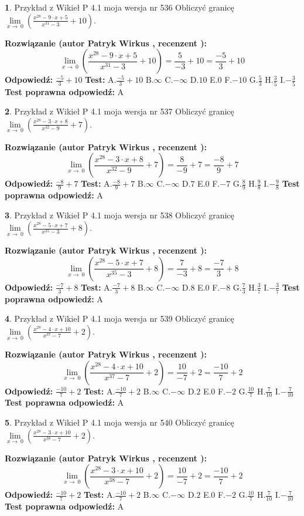 \documentclass[12pt, a4paper]{article}
\theoremstyle{definition} %
\newtheorem{zad}{}
\newcommand{\zadStart}[1]{\begin{zad}#1\newline}
\newcommand{\zadStop}{\end{zad}}
\newcommand{\rozwStart}[2]{\noindent \textbf{Rozwiązanie (autor #1 , recenzent #2): }\newline}
\newcommand{\rozwStop}{\newline}
\newcommand{\odpStart}{\noindent \textbf{Odpowiedź:}\newline}
\newcommand{\odpStop}{\newline}
\newcommand{\testStart}{\noindent \textbf{Test:}\newline}
\newcommand{\testStop}{\newline}
\newcommand{\kluczStart}{\noindent \textbf{Test poprawna odpowiedź:}\newline}
\newcommand{\kluczStop}{\newline}
\begin{document}
\zadStart{Przykład z Wikieł P 4.1 moja wersja nr 536}
Obliczyć granicę $\lim\limits_{x\to\ 0}(\frac{x^{28}-9 \cdot x +5}{x^{31}-3}+10)$.
\zadStop
\rozwStart{Patryk Wirkus}{}
$$\lim\limits_{x\to\ 0}(\frac{x^{28}-9 \cdot x +5}{x^{31}-3}+10)=\frac{5}{-3}+10=\frac{-5}{3}+10$$
\rozwStop
\odpStart
$\frac{-5}{3}+10$
\odpStop
\testStart
A.$\frac{-5}{3}+10$
B.$\infty$
C.$-\infty$
D.$10$
E.$0$
F.$-10$
G.$\frac{5}{3}$
H.$\frac{3}{5}$
I.$-\frac{3}{5}$
\testStop
\kluczStart
A
\kluczStop



\zadStart{Przykład z Wikieł P 4.1 moja wersja nr 537}
Obliczyć granicę $\lim\limits_{x\to\ 0}(\frac{x^{28}-3 \cdot x +8}{x^{32}-9}+7)$.
\zadStop
\rozwStart{Patryk Wirkus}{}
$$\lim\limits_{x\to\ 0}(\frac{x^{28}-3 \cdot x +8}{x^{32}-9}+7)=\frac{8}{-9}+7=\frac{-8}{9}+7$$
\rozwStop
\odpStart
$\frac{-8}{9}+7$
\odpStop
\testStart
A.$\frac{-8}{9}+7$
B.$\infty$
C.$-\infty$
D.$7$
E.$0$
F.$-7$
G.$\frac{8}{9}$
H.$\frac{9}{8}$
I.$-\frac{9}{8}$
\testStop
\kluczStart
A
\kluczStop



\zadStart{Przykład z Wikieł P 4.1 moja wersja nr 538}
Obliczyć granicę $\lim\limits_{x\to\ 0}(\frac{x^{28}-5 \cdot x +7}{x^{35}-3}+8)$.
\zadStop
\rozwStart{Patryk Wirkus}{}
$$\lim\limits_{x\to\ 0}(\frac{x^{28}-5 \cdot x +7}{x^{35}-3}+8)=\frac{7}{-3}+8=\frac{-7}{3}+8$$
\rozwStop
\odpStart
$\frac{-7}{3}+8$
\odpStop
\testStart
A.$\frac{-7}{3}+8$
B.$\infty$
C.$-\infty$
D.$8$
E.$0$
F.$-8$
G.$\frac{7}{3}$
H.$\frac{3}{7}$
I.$-\frac{3}{7}$
\testStop
\kluczStart
A
\kluczStop



\zadStart{Przykład z Wikieł P 4.1 moja wersja nr 539}
Obliczyć granicę $\lim\limits_{x\to\ 0}(\frac{x^{28}-4 \cdot x +10}{x^{37}-7}+2)$.
\zadStop
\rozwStart{Patryk Wirkus}{}
$$\lim\limits_{x\to\ 0}(\frac{x^{28}-4 \cdot x +10}{x^{37}-7}+2)=\frac{10}{-7}+2=\frac{-10}{7}+2$$
\rozwStop
\odpStart
$\frac{-10}{7}+2$
\odpStop
\testStart
A.$\frac{-10}{7}+2$
B.$\infty$
C.$-\infty$
D.$2$
E.$0$
F.$-2$
G.$\frac{10}{7}$
H.$\frac{7}{10}$
I.$-\frac{7}{10}$
\testStop
\kluczStart
A
\kluczStop



\zadStart{Przykład z Wikieł P 4.1 moja wersja nr 540}
Obliczyć granicę $\lim\limits_{x\to\ 0}(\frac{x^{28}-3 \cdot x +10}{x^{38}-7}+2)$.
\zadStop
\rozwStart{Patryk Wirkus}{}
$$\lim\limits_{x\to\ 0}(\frac{x^{28}-3 \cdot x +10}{x^{38}-7}+2)=\frac{10}{-7}+2=\frac{-10}{7}+2$$
\rozwStop
\odpStart
$\frac{-10}{7}+2$
\odpStop
\testStart
A.$\frac{-10}{7}+2$
B.$\infty$
C.$-\infty$
D.$2$
E.$0$
F.$-2$
G.$\frac{10}{7}$
H.$\frac{7}{10}$
I.$-\frac{7}{10}$
\testStop
\kluczStart
A
\kluczStop
\end{document}
